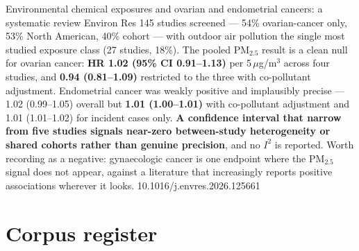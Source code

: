 \documentclass[10pt]{article}
\begin{document}
{Environmental chemical exposures and ovarian and endometrial cancers: a systematic review}
{Environ Res}
{145 studies screened --- 54\% ovarian-cancer only, 53\% North American, 40\% cohort ---
with outdoor air pollution the single most studied exposure class (27 studies, 18\%).
The pooled PM$_{2.5}$ result is a clean null for ovarian cancer: \textbf{HR 1.02 (95\% CI
0.91--1.13)} per 5\,$\mu$g/m$^3$ across four studies, and \textbf{0.94 (0.81--1.09)}
restricted to the three with co-pollutant adjustment. Endometrial cancer was weakly
positive and implausibly precise --- 1.02 (0.99--1.05) overall but \textbf{1.01
(1.00--1.01)} with co-pollutant adjustment and 1.01 (1.01--1.02) for incident cases only.
\textbf{A confidence interval that narrow from five studies signals near-zero
between-study heterogeneity or shared cohorts rather than genuine precision}, and no
$I^2$ is reported. Worth recording as a negative: gynaecologic cancer is one endpoint where
the PM$_{2.5}$ signal does not appear, against a literature that increasingly reports
positive associations wherever it looks.}
{10.1016/j.envres.2026.125661}

\clearpage

\section*{\sffamily\bfseries\color{Deep}Corpus register}
\vspace{-1.5mm}{\color{Amber}\rule{\linewidth}{1.1pt}}\vspace{2.5mm}


\end{document}

